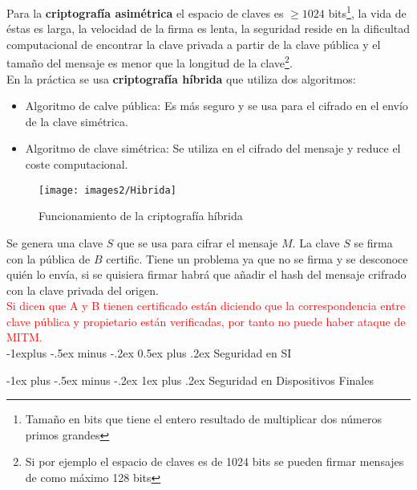 \documentclass[10pt,portrait, twocolumn]{article}
\makeatletter
\renewcommand{\subsection}{\@startsection{subsection}{2}{0mm}%
                                {-1explus -.5ex minus -.2ex}%
                                {0.5ex plus .2ex}%
                                {\normalfont\normalsize\bfseries}}
\renewcommand{\subsubsection}{\@startsection{subsubsection}{3}{0mm}%
                                {-1ex plus -.5ex minus -.2ex}%
                                {1ex plus .2ex}%
                                {\normalfont\small\bfseries}}
\makeatother
\begin{document}
\quad Para la \textbf{criptografía asimétrica} el espacio de claves es $\geq 1024$ bits\footnote{Tamaño en bits que tiene el entero resultado de multiplicar dos números primos grandes}, la vida de éstas es larga, la velocidad de la firma es lenta, la seguridad reside en la dificultad computacional de encontrar la clave privada a partir de la clave pública y el tamaño del mensaje es menor que la longitud de la clave\footnote{Si por ejemplo el espacio de claves es de 1024 bits se pueden firmar mensajes de como máximo 128 bits}.\\

En la práctica se usa \textbf{criptografía híbrida} que utiliza dos algoritmos:

	\begin{itemize}
	\item Algoritmo de calve pública: Es más seguro y se usa para el cifrado en el envío de la clave simétrica.
	\item Algoritmo de clave simétrica: Se utiliza en el cifrado del mensaje y reduce el coste computacional.
	\end{itemize}

	\begin{figure}[ht!]
	\centering
	\texttt{[image: images2/Hibrida]}
	\caption{Funcionamiento de la criptografía híbrida}
	\label{figure:Planta1}
	\end{figure}

	
Se genera una clave $S$ que se usa para cifrar el mensaje $M$. La clave $S$ se firma con la pública de $B$ certific. Tiene un problema ya que no se firma y se desconoce quién lo envía, si se quisiera firmar habrá que añadir el hash del mensaje crifrado con la clave privada del origen.\\

\textcolor{red}{Si dicen que A y B tienen certificado están diciendo que la correspondencia entre clave pública y propietario están verificadas, por tanto no puede haber ataque de MITM.}\\

\subsection{Seguridad en SI}

\subsubsection{Seguridad en Dispositivos Finales}
\end{document}
